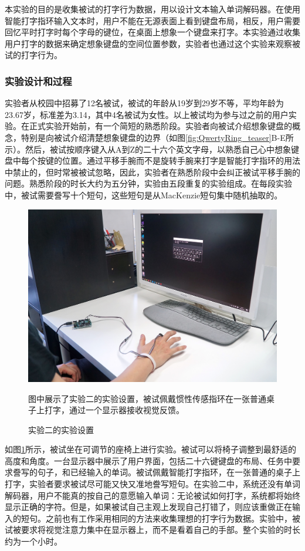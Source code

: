 本实验的目的是收集被试的打字行为数据，用以设计文本输入单词解码器。在使用智能打字指环输入文本时，用户不能在无源表面上看到键盘布局，相反，用户需要回忆平时打字时每个字母的键位，在桌面上想象一个键盘来打字。本实验通过收集用户打字的数据来确定想象键盘的空间位置参数，实验者也通过这个实验来观察被试的打字行为。

\subsubsection{实验设计和过程}

实验者从校园中招募了12名被试，被试的年龄从19岁到29岁不等，平均年龄为23.67岁，标准差为3.14，其中4名被试为女性。以上被试均为参与过之前的用户实验。在正式实验开始前，有一个简短的熟悉阶段。实验者向被试介绍想象键盘的概念，特别是向被试介绍清楚想象键盘的边界（如图\ref{fig:QwertyRing_teaser}B-E所示）。然后，被试按顺序键入从A到Z的二十六个英文字母，以熟悉自己心中想象键盘中每个按键的位置。通过平移手腕而不是旋转手腕来打字是智能打字指环的用法中禁止的，但时常被被试忽略，因此，实验者在熟悉阶段中会纠正被试平移手腕的问题。熟悉阶段的时长大约为五分钟，实验由五段重复的实验组成。在每段实验中，被试需要誊写十个短句，这些短句是从MacKenzie短句集\cite{mackenzie2003phrase}中随机抽取的。

\begin{figure}[!htbp]
	\centering
	\includegraphics[width=0.8\linewidth]{figures/QwertyRing_config2.jpg}
	\caption*{图中展示了实验二的实验设置，被试佩戴惯性传感指环在一张普通桌子上打字，通过一个显示器接收视觉反馈。}
	\caption{实验二的实验设置}
	\label{fig:QwertyRing_config2}
\end{figure}

如图\ref{fig:QwertyRing_config2}所示，被试坐在可调节的座椅上进行实验。被试可以将椅子调整到最舒适的高度和角度。一台显示器中展示了用户界面，包括二十六键键盘的布局、任务中要求誊写的句子，和已经输入的单词。被试佩戴智能打字指环，在一张普通的桌子上打字，实验者要求被试尽可能又快又准地誊写短句。在实验二中，系统还没有单词解码器，用户不能真的按自己的意愿输入单词：无论被试如何打字，系统都将始终显示正确的字符。但是，如果被试自己主观上发现自己打错了，则应该重做正在输入的短句。之前也有工作\cite{lu2017blindtype, azenkot2012touch, findlater2011typing}采用相同的方法来收集理想的打字行为数据。实验中，被试被要求将视觉注意力集中在显示器上，而不是看着自己的手部。整个实验的时长约为一个小时。

